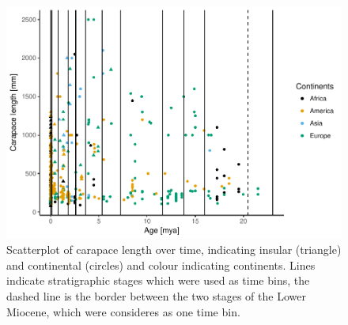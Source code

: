 \begin{figure}[htbp]
	\centering
	\includegraphics{MA_JJ_files/figure-latex/overviewData-1.pdf}
	\caption[Carapace length over time]{Scatterplot of carapace length over time, indicating insular
		(triangle) and continental (circles) and colour indicating continents.
		Lines indicate stratigraphic stages which were used as time bins, the
		dashed line is the border between the two stages of the Lower Miocene,
		which were consideres as one time bin.}
	\label{fig:bins}
\end{figure}
